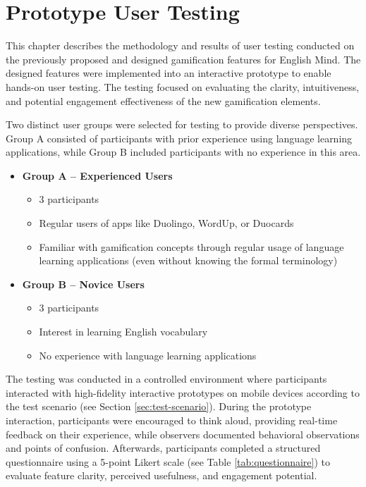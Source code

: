 \chapter{Prototype User Testing}
\label{chap:prototype-user-testing}

This chapter describes the methodology and results of user testing conducted on the previously proposed and designed gamification features for English Mind. The designed features were implemented into an interactive prototype to enable hands-on user testing. The testing focused on evaluating the clarity, intuitiveness, and potential engagement effectiveness of the new gamification elements.

Two distinct user groups were selected for testing to provide diverse perspectives. Group A consisted of participants with prior experience using language learning applications, while Group B included participants with no experience in this area.
\begin{itemize}
    \item \textbf{Group A – Experienced Users}
    \begin{itemize}
        \item 3 participants
        \item Regular users of apps like Duolingo, WordUp, or Duocards
        \item Familiar with gamification concepts through regular usage of language learning applications (even without knowing the formal terminology)
    \end{itemize}

    \item \textbf{Group B – Novice Users}
    \begin{itemize}
        \item 3 participants
        \item Interest in learning English vocabulary
        \item No experience with language learning applications
    \end{itemize}
\end{itemize}

The testing was conducted in a controlled environment where participants interacted with high-fidelity interactive prototypes on mobile devices according to the test scenario (see Section \ref{sec:test-scenario}). During the prototype interaction, participants were encouraged to think aloud, providing real-time feedback on their experience, while observers documented behavioral observations and points of confusion. Afterwards, participants completed a structured questionnaire using a 5-point Likert scale (see Table \ref{tab:questionnaire}) to evaluate feature clarity, perceived usefulness, and engagement potential.


